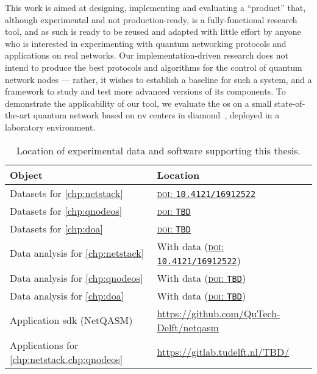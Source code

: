 This work is aimed at designing, implementing and evaluating a ``product'' that, although
experimental and not production-ready, is a fully-functional research tool, and as such is ready to
be reused and adapted with little effort by anyone who is interested in experimenting with quantum
networking protocols and applications on real networks. Our implementation-driven research does not
intend to produce the best protocols and algorithms for the control of quantum network nodes ---
rather, it wishes to establish a baseline for such a system, and a framework to study and test more
advanced versions of its components. To demonstrate the applicability of our tool, we evaluate the
\acrshort{os} on a small state-of-the-art quantum network based on \acrlong{nv} centers in
diamond~\cite{pompili_2021_multinode}, deployed in a laboratory environment.

\begin{table}[t]
    \centering
    \begin{tabularx}{\linewidth}{lX}
        \toprule
        \textbf{Object}                                  & \textbf{Location}                                                                            \\
        \midrule
        Datasets for \cref{chp:netstack}                 & \href{https://doi.org/10.4121/16912522}{\textsc{doi}: \texttt{10.4121/16912522}}             \\
        Datasets for \cref{chp:qnodeos}                  & \href{https://doi.org/xx.xxxx/xxxxxxxx}{\textsc{doi}: \texttt{TBD}}                          \\
        Datasets for \cref{chp:doa}                      & \href{https://doi.org/yy.yyyy/yyyyyyyy}{\textsc{doi}: \texttt{TBD}}                          \\
        Data analysis for \cref{chp:netstack}            & With data (\href{https://doi.org/10.4121/16912522}{\textsc{doi}: \texttt{10.4121/16912522}}) \\
        Data analysis for \cref{chp:qnodeos}             & With data (\href{https://doi.org/xx.xxxx/xxxxxxxx}{\textsc{doi}: \texttt{TBD}})              \\
        Data analysis for \cref{chp:doa}                 & With data (\href{https://doi.org/yy.yyyy/yyyyyyyy}{\textsc{doi}: \texttt{TBD}})              \\
        Application \acrshort{sdk} (NetQASM)             & \url{https://github.com/QuTech-Delft/netqasm}                                                \\
        Applications for \cref{chp:netstack,chp:qnodeos} & \url{https://gitlab.tudelft.nl/TBD/}                                                         \\
        \bottomrule
    \end{tabularx}
    \caption{
        Location of experimental data and software supporting this thesis.
    }
    \label{tab:data-and-soft}
\end{table}

